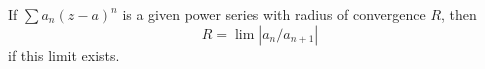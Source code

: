 If $\sum a_n(z-a)^n$ is a given power series with radius of convergence $R$, then
$$R = \lim |a_n / a_{n+1}|$$
if this limit exists.
